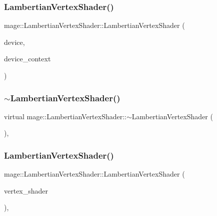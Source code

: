 \subsubsection{\texorpdfstring{Lambertian\+Vertex\+Shader()}{LambertianVertexShader()}\hspace{0.1cm}{\footnotesize\ttfamily [1/3]}}
{\footnotesize\ttfamily mage\+::\+Lambertian\+Vertex\+Shader\+::\+Lambertian\+Vertex\+Shader (\begin{DoxyParamCaption}\item[{I\+D3\+D11\+Device2 $\ast$}]{device,  }\item[{I\+D3\+D11\+Device\+Context2 $\ast$}]{device\+\_\+context }\end{DoxyParamCaption})}

\hypertarget{classmage_1_1_lambertian_vertex_shader_a55636fd3817b97b6529690d6e3e5cd46}{}\label{classmage_1_1_lambertian_vertex_shader_a55636fd3817b97b6529690d6e3e5cd46} 
\subsubsection{\texorpdfstring{$\sim$\+Lambertian\+Vertex\+Shader()}{~LambertianVertexShader()}}
{\footnotesize\ttfamily virtual mage\+::\+Lambertian\+Vertex\+Shader\+::$\sim$\+Lambertian\+Vertex\+Shader (\begin{DoxyParamCaption}{ }\end{DoxyParamCaption})\hspace{0.3cm}{\ttfamily [virtual]}, {\ttfamily [default]}}

\hypertarget{classmage_1_1_lambertian_vertex_shader_add164d66906e307d95232b2c41567a21}{}\label{classmage_1_1_lambertian_vertex_shader_add164d66906e307d95232b2c41567a21} 
\subsubsection{\texorpdfstring{Lambertian\+Vertex\+Shader()}{LambertianVertexShader()}\hspace{0.1cm}{\footnotesize\ttfamily [2/3]}}
{\footnotesize\ttfamily mage\+::\+Lambertian\+Vertex\+Shader\+::\+Lambertian\+Vertex\+Shader (\begin{DoxyParamCaption}\item[{const \hyperlink{classmage_1_1_lambertian_vertex_shader}{Lambertian\+Vertex\+Shader} \&}]{vertex\+\_\+shader }\end{DoxyParamCaption})\hspace{0.3cm}{\ttfamily [private]}, {\ttfamily [delete]}}

